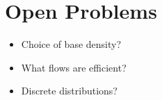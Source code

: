 \documentclass[12pt,fleqn,twocolumn]{article}
\begin{document}
\section*{Open Problems}%
\label{sec:Open Problems}
\begin{itemize}
    \item Choice of base density?
    \item What flows are efficient?
    \item Discrete distributions?
\end{itemize}

\clearpage
\renewcommand*{\bibfont}{\normalfont\footnotesize}
\printbibliography[heading=bibintoc]

\printglossary[type=\acronymtype]
\end{document}
